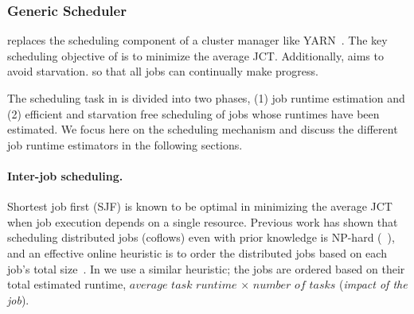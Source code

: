 
\subsubsection{Generic Scheduler \gs}
\label{sec:design:gs}

\gs replaces the scheduling component of a cluster manager like YARN~\cite{yarn:web}. 
The key scheduling objective of \gs is to minimize the average JCT.
Additionally, \gs aims to avoid starvation.
\rm{so that all jobs can continually make progress.}

The scheduling task in \gs is divided into two phases, (1) job runtime estimation
and (2) efficient and starvation free scheduling of jobs whose runtimes have been
estimated. 
We focus here on the scheduling mechanism 
and discuss the different job runtime estimators in the following sections.


\paragraph{Inter-job scheduling. }
Shortest job first (SJF) is known to be optimal in minimizing the average JCT
when job execution depends on a single resource.
Previous work has shown
that scheduling distributed jobs (\eg coflows) even with prior knowledge is NP-hard (\eg~\cite{varys:sigcomm14}),
and an effective online heuristic is to order the distributed jobs
based on each job's total size~\cite{aalo:sigcomm15}.
{In \gs we use} a similar heuristic;
the jobs are ordered based on their total estimated runtime, \ie $average$ $task$ $runtime$
$\times$ $number$ $of$ $tasks$ (\textit{impact of the job}).

